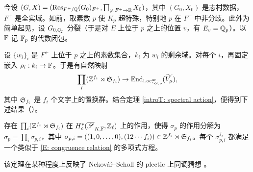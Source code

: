 今设 $(G,X)=({\operatorname{Res}}_{F^+/{\mathbb Q}}(G_0)_{F^+}, \prod_{\varphi :F^+\to {\mathbb R}} X_0)$，其中 $(G_0,X_0)$ 是志村数据，$F^+$ 是全实域。如前，取素数 $p$ 使 $K_p$ 超特殊，特别地 $p$ 在 $F^+$ 中非分歧。此外为简单起见，设 $G_{0,{\mathbb Q}_p}$ 分裂（于是对 $E$ 上位于 $p$ 之上的位置 $v$，有 $E_v={\mathbb Q}_p$）。以 ${\mathbb F}$ 记 ${\mathbb F}_p$ 的代数闭包。

设 $\{w_i\}_i$ 是 $F^+$ 上位于 $p$ 之上的素数集合，$k_i$ 为 $w_i$ 的剩余域。对每个 $i$，再固定嵌入 $\rho_i: k_i\to{\mathbb F}$。于是有自然映射
\[
\prod_i({\mathbb Z}^{f_i}\rtimes {\mathfrak S}_{f_i})\to {\operatorname{End}}_{{\operatorname{Loc}}_{{}^cG,p}^{{\operatorname{ur}}}}(\widetilde{V_\mu}),
\]
其中 ${\mathfrak S}_{f_i}$ 是 $f_i$ 个文字上的置换群。结合定理 \ref{introT: spectral action}，便得到下述结果（\cite{Xiao-Zhu-Cycle}）。

\begin{thm}
存在 $\prod_i({\mathbb Z}^{f_i}\rtimes {\mathfrak S}_{f_i})$ 在 $H_c^*(\overline{{\mathscr S}}_{K,\overline{{\mathbb F}}},{\mathbb Z}_\ell)$ 上的作用，使得 $\sigma_p$ 的作用分解为 $\sigma_p=\prod_i \sigma_{p,i}$，其中 $\sigma_{p,i}=((1,0,\ldots,0), (12\cdots f_i))\in {\mathbb Z}^{f_i}\rtimes{\mathfrak S}_{f_i}$。每个 $\sigma_{p,i}^{f_i}$ 都满足一个类似于 \eqref{E: congruence relation} 的多项式方程。
\end{thm}

该定理在某种程度上反映了 Nekovář--Scholl 的 plectic 上同调猜想 \cite{Nekovar-Scholl-Plectic}。

